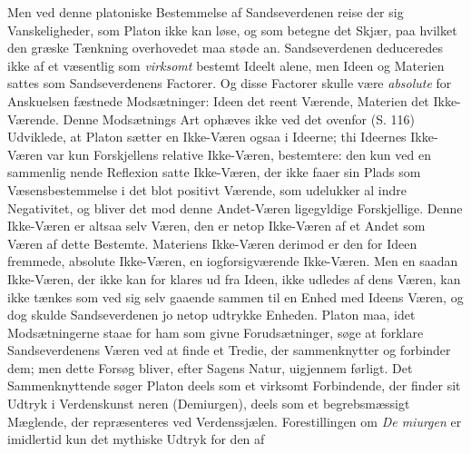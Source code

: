 \documentclass[12pt,a4paper]{book}
\begin{document}
Men ved denne platoniske Bestemmelse af Sandseverdenen
reise der sig Vanskeligheder, som Platon ikke kan løse, og
som betegne det Skjær, paa hvilket den græske Tænkning
overhovedet maa støde an. Sandseverdenen deduceredes ikke
af et væsentlig som \emph{virksomt} bestemt Ideelt alene, men
Ideen og Materien sattes som Sandseverdenens Factorer. Og
disse Factorer skulle være \emph{absolute} for Anskuelsen fæstnede
Modsætninger: Ideen det reent Værende, Materien det Ikke-Værende.
Denne Modsætnings Art ophæves ikke ved det
ovenfor (S. 116) Udviklede, at Platon sætter en Ikke-Væren
ogsaa i Ideerne; thi Ideernes Ikke-Væren var kun Forskjellens
relative Ikke-Væren, bestemtere: den kun ved en sammenlig\-%
nende Reflexion satte Ikke-Væren, der ikke faaer sin Plads
som Væsensbestemmelse i det blot positivt Værende, som
udelukker al indre Negativitet, og bliver det mod denne Andet-Væren
ligegyldige Forskjellige. Denne Ikke-Væren er altsaa
selv Væren, den er netop Ikke-Væren af et Andet som Væren
af dette Bestemte. Materiens Ikke-Væren derimod er den for
Ideen fremmede, absolute Ikke-Væren, en iogforsigværende
Ikke-Væren. Men en saadan Ikke-Væren, der ikke kan for\-%
klares ud fra Ideen, ikke udledes af dens Væren, kan ikke
tænkes som ved sig selv gaaende sammen til en Enhed med
Ideens Væren, og dog skulde Sandseverdenen jo netop udtrykke
Enheden. Platon maa, idet Modsætningerne staae for ham
som givne Forudsætninger, søge at forklare Sandseverdenens
Væren ved at finde et Tredie, der sammenknytter og forbinder
dem; men dette Forsøg bliver, efter Sagens Natur, uigjennem\-%
førligt. Det Sammenknyttende søger Platon deels som et
virksomt Forbindende, der finder sit Udtryk i Verdenskunst\-%
neren (Demiurgen), deels som et begrebsmæssigt Mæglende,
der repræsenteres ved Verdenssjælen. Forestillingen om \emph{De\-%
miurgen} er imidlertid kun det mythiske Udtryk for den af
\end{document}
